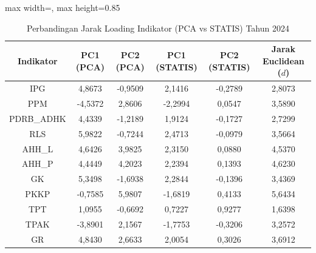 \begin{table}[H]
\centering
\caption{Perbandingan Jarak Loading Indikator (PCA vs STATIS) Tahun 2024} \label{tab:app1jarak_loading_2024}
\begin{adjustbox}{max width=\textwidth, max height=0.85\textheight}
\begin{tabular}{|c|c|c|c|c|c|}
\hline
\textbf{Indikator} & \textbf{PC1 (PCA)} & \textbf{PC2 (PCA)} & \textbf{PC1 (STATIS)} & \textbf{PC2 (STATIS)} & \textbf{Jarak Euclidean ($d$)} \\
\hline
IPG & 4,8673 & -0,9509 & 2,1416 & -0,2789 & 2,8073 \\
PPM & -4,5372 & 2,8606 & -2,2994 & 0,0547 & 3,5890 \\
PDRB\_ADHK & 4,4339 & -1,2189 & 1,9124 & -0,1727 & 2,7299 \\
RLS & 5,9822 & -0,7244 & 2,4713 & -0,0979 & 3,5664 \\
AHH\_L & 4,6426 & 3,9825 & 2,3150 & 0,0880 & 4,5370 \\
AHH\_P & 4,4449 & 4,2023 & 2,2394 & 0,1393 & 4,6230 \\
GK & 5,3498 & -1,6938 & 2,2844 & -0,1396 & 3,4369 \\
PKKP & -0,7585 & 5,9807 & -1,6819 & 0,4133 & 5,6434 \\
TPT & 1,0955 & -0,6692 & 0,7227 & 0,9277 & 1,6398 \\
TPAK & -3,8901 & 2,1567 & -1,7753 & -0,3206 & 3,2572 \\
GR & 4,8430 & 2,6633 & 2,0054 & 0,3026 & 3,6912 \\
\hline
\end{tabular}
\end{adjustbox}
\end{table}